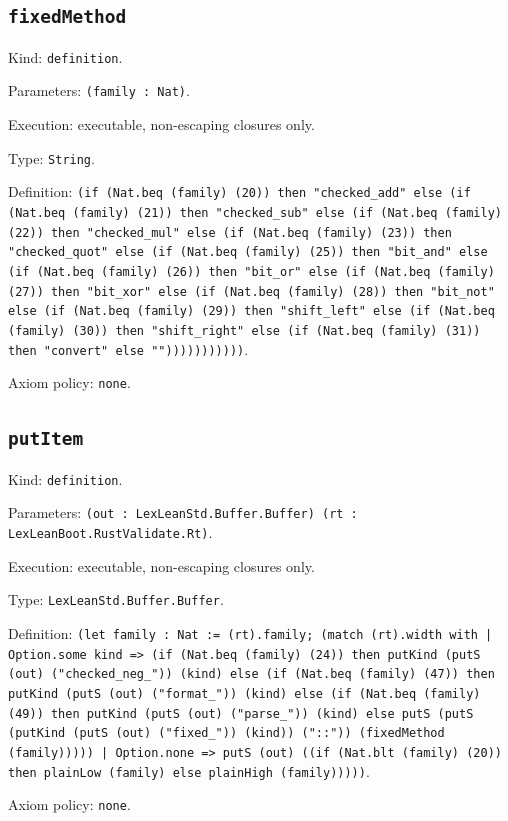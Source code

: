 \documentclass[11pt]{article}
\begin{document}
\subsection*{\texttt{fixedMethod}}
\noindent Kind: \texttt{definition}.\par
\noindent Parameters: \texttt{(family : Nat)}.\par
\noindent Execution: executable, non-escaping closures only.\par
\noindent Type: \texttt{String}.\par
\noindent Definition: \texttt{(if (Nat.beq (family) (20)) then "checked\_add" else (if (Nat.beq (family) (21)) then "checked\_sub" else (if (Nat.beq (family) (22)) then "checked\_mul" else (if (Nat.beq (family) (23)) then "checked\_quot" else (if (Nat.beq (family) (25)) then "bit\_and" else (if (Nat.beq (family) (26)) then "bit\_or" else (if (Nat.beq (family) (27)) then "bit\_xor" else (if (Nat.beq (family) (28)) then "bit\_not" else (if (Nat.beq (family) (29)) then "shift\_left" else (if (Nat.beq (family) (30)) then "shift\_right" else (if (Nat.beq (family) (31)) then "convert" else "")))))))))))}.\par
\noindent Axiom policy: \texttt{none}.\par
\subsection*{\texttt{putItem}}
\noindent Kind: \texttt{definition}.\par
\noindent Parameters: \texttt{(out : LexLeanStd.Buffer.Buffer) (rt : LexLeanBoot.RustValidate.Rt)}.\par
\noindent Execution: executable, non-escaping closures only.\par
\noindent Type: \texttt{LexLeanStd.Buffer.Buffer}.\par
\noindent Definition: \texttt{(let family : Nat := (rt).family; (match (rt).width with | Option.some kind => (if (Nat.beq (family) (24)) then putKind (putS (out) ("checked\_neg\_")) (kind) else (if (Nat.beq (family) (47)) then putKind (putS (out) ("format\_")) (kind) else (if (Nat.beq (family) (49)) then putKind (putS (out) ("parse\_")) (kind) else putS (putS (putKind (putS (out) ("fixed\_")) (kind)) ("::")) (fixedMethod (family))))) | Option.none => putS (out) ((if (Nat.blt (family) (20)) then plainLow (family) else plainHigh (family)))))}.\par
\noindent Axiom policy: \texttt{none}.\par
\end{document}
